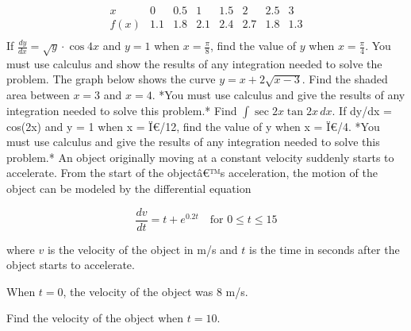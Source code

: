 \documentclass[12pt,addpoints]{exam}
\begin{document}
\begin{questions}
\[
\begin{array}{c|ccccccc}
x & 0 & 0.5 & 1 & 1.5 & 2 & 2.5 & 3 \\
\hline
f(x) & 1.1 & 1.8 & 2.1 & 2.4 & 2.7 & 1.8 & 1.3 \\
\end{array}
\]
\fillwithlines{5cm}
\question[5] If \( \frac{dy}{dx} = \sqrt{y} \cdot \cos 4x \) and \( y = 1 \) when \( x = \frac{\pi}{8} \), find the value of \( y \) when \( x = \frac{\pi}{4} \). You must use calculus and show the results of any integration needed to solve the problem.
\fillwithlines{5cm}
\question[5] The graph below shows the curve \( y = x + 2\sqrt{x - 3} \). Find the shaded area between \( x = 3 \) and \( x = 4 \). *You must use calculus and give the results of any integration needed to solve this problem.*
\fillwithlines{5cm}
\question[5] Find \(\int \sec 2x \tan 2x \, dx\).
\fillwithlines{5cm}
\question[5] If dy/dx = cos(2x) and y = 1 when x = Ï€/12, find the value of y when x = Ï€/4. *You must use calculus and give the results of any integration needed to solve this problem.*
\fillwithlines{5cm}
\question[5] An object originally moving at a constant velocity suddenly starts to accelerate. From the start of the objectâ€™s acceleration, the motion of the object can be modeled by the differential equation

\[ \frac{dv}{dt} = t + e^{0.2t} \quad \text{for } 0 \leq t \leq 15 \]

where \( v \) is the velocity of the object in m/s and \( t \) is the time in seconds after the object starts to accelerate.

When \( t = 0 \), the velocity of the object was 8 m/s.

Find the velocity of the object when \( t = 10 \).


\end{questions}
\end{document}
